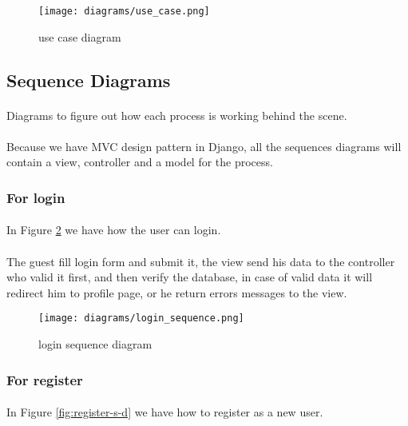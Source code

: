 		\begin{figure}[!ht]
			\centering
			\texttt{[image: diagrams/use\_case.png]}
			\caption{use case diagram}
			\label{fig:use-case-d}
		\end{figure}
	
	\subsection{Sequence Diagrams}
	\paragraph{}
	Diagrams to figure out how each process is working behind the scene.
	\paragraph{}
	Because we have MVC design pattern in Django, all the sequences diagrams will contain a view, controller and a model for the process.
	
	
	\subsubsection{For login}
	\paragraph{}
	In Figure \ref{fig:login-s-d} we have how the user can login.
	\paragraph{}
	The guest fill login form and submit it, the view send his data to the controller who valid it first, and then verify the database, in case of valid data it will redirect him to profile page, or he return errors messages to the view.
	
		\begin{figure}[!ht]
			\centering
			\texttt{[image: diagrams/login\_sequence.png]}
			\caption{login sequence diagram}
			\label{fig:login-s-d}
		\end{figure}
	
	\subsubsection{For register}
	\paragraph{}
	In Figure \ref{fig:register-s-d} we have how to register as a new user.
